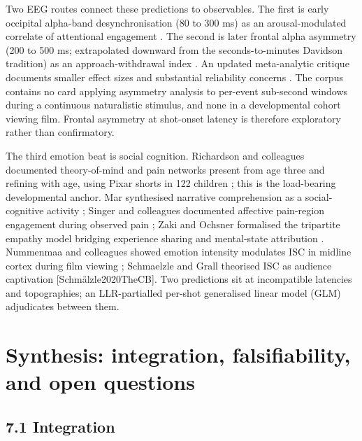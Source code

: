 \documentclass[preprint,12pt]{elsarticle}
\begin{document}
Two EEG routes connect these predictions to observables. The first is early occipital alpha-band desynchronisation (80 to 300 ms) as an arousal-modulated correlate of attentional engagement \cite{Codispoti2023AlphabandOA}. The second is later frontal alpha asymmetry (200 to 500 ms; extrapolated downward from the seconds-to-minutes Davidson tradition) as an approach-withdrawal index \cite{Davidson2000AffectiveSP,Coan2004FrontalEA}. An updated meta-analytic critique documents smaller effect sizes and substantial reliability concerns \cite{Reznik2018FrontalAA}. The corpus contains no card applying asymmetry analysis to per-event sub-second windows during a continuous naturalistic stimulus, and none in a developmental cohort viewing film. Frontal asymmetry at shot-onset latency is therefore exploratory rather than confirmatory.

The third emotion beat is social cognition. Richardson and colleagues documented theory-of-mind and pain networks present from age three and refining with age, using Pixar shorts in 122 children \cite{Richardson2018DevelopmentOT}; this is the load-bearing developmental anchor. Mar synthesised narrative comprehension as a social-cognitive activity \cite{Mar2011TheNB}; Singer and colleagues documented affective pain-region engagement during observed pain \cite{Singer2004EmpathyFP}; Zaki and Ochsner formalised the tripartite empathy model bridging experience sharing and mental-state attribution \cite{Zaki2012TheNO}. Nummenmaa and colleagues showed emotion intensity modulates ISC in midline cortex during film viewing \cite{Nummenmaa2012EmotionsPS}; Schmaelzle and Grall theorised ISC as audience captivation [Schmälzle2020TheCB]. Two predictions sit at incompatible latencies and topographies; an LLR-partialled per-shot generalised linear model (GLM) adjudicates between them.

\section{Synthesis: integration, falsifiability, and open questions}

\subsection{7.1 Integration}
\end{document}
